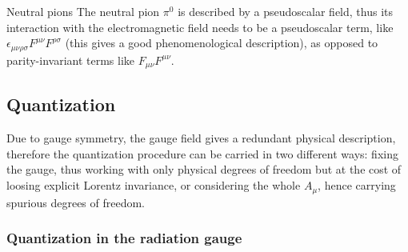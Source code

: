 \begin{example}{Neutral pions}{}
  The neutral pion $ \pi^0 $ is described by a pseudoscalar field, thus its interaction with the electromagnetic field needs to be a pseudoscalar term, like $ \epsilon_{\mu \nu \rho \sigma} F^{\mu \nu} F^{\rho \sigma} $ (this gives a good phenomenological description), as opposed to parity-invariant terms like $ F_{\mu \nu} F^{\mu \nu} $.
\end{example}

\subsection{Quantization}

Due to gauge symmetry, the gauge field gives a redundant physical description, therefore the quantization procedure can be carried in two different ways: fixing the gauge, thus working with only physical degrees of freedom but at the cost of loosing explicit Lorentz invariance, or considering the whole $ A_\mu $, hence carrying spurious degrees of freedom.

\subsubsection{Quantization in the radiation gauge}

